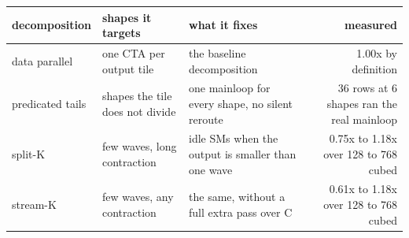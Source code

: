 \begin{tabular}{lllr}
\toprule
decomposition & shapes it targets & what it fixes & measured \\
\midrule
data parallel & one CTA per output tile & the baseline decomposition & 1.00x by definition \\
predicated tails & shapes the tile does not divide & one mainloop for every shape, no silent reroute & 36 rows at 6 shapes ran the real mainloop \\
split-K & few waves, long contraction & idle SMs when the output is smaller than one wave & 0.75x to 1.18x over 128 to 768 cubed \\
stream-K & few waves, any contraction & the same, without a full extra pass over C & 0.61x to 1.18x over 128 to 768 cubed \\
\bottomrule
\end{tabular}
